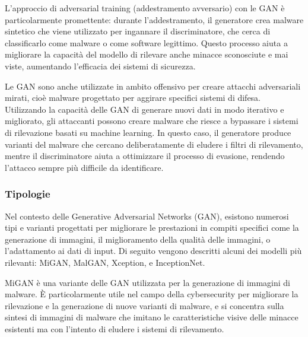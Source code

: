 L'approccio di adversarial training (addestramento avversario) con le GAN è particolarmente promettente: durante l'addestramento, il generatore crea malware sintetico che viene utilizzato per ingannare il discriminatore, che cerca di classificarlo come malware o come software legittimo. Questo processo aiuta a migliorare la capacità del modello di rilevare anche minacce sconosciute e mai viste, aumentando l'efficacia dei sistemi di sicurezza.

Le GAN sono anche utilizzate in ambito offensivo per creare attacchi adversariali mirati, cioè malware progettato per aggirare specifici sistemi di difesa. Utilizzando la capacità delle GAN di generare nuovi dati in modo iterativo e migliorato, gli attaccanti possono creare malware che riesce a bypassare i sistemi di rilevazione basati su machine learning. In questo caso, il generatore produce varianti del malware che cercano deliberatamente di eludere i filtri di rilevamento, mentre il discriminatore aiuta a ottimizzare il processo di evasione, rendendo l'attacco sempre più difficile da identificare.

\subsubsection{Tipologie}
Nel contesto delle Generative Adversarial Networks (GAN), esistono numerosi tipi e varianti progettati per migliorare le prestazioni in compiti specifici come la generazione di immagini, il miglioramento della qualità delle immagini, o l'adattamento ai dati di input. Di seguito vengono descritti alcuni dei modelli più rilevanti: MiGAN, MalGAN, Xception, e InceptionNet.

MiGAN è una variante delle GAN utilizzata per la generazione di immagini di malware. È particolarmente utile nel campo della cybersecurity per migliorare la rilevazione e la generazione di nuove varianti di malware, e si concentra sulla sintesi di immagini di malware che imitano le caratteristiche visive delle minacce esistenti ma con l'intento di eludere i sistemi di rilevamento.

